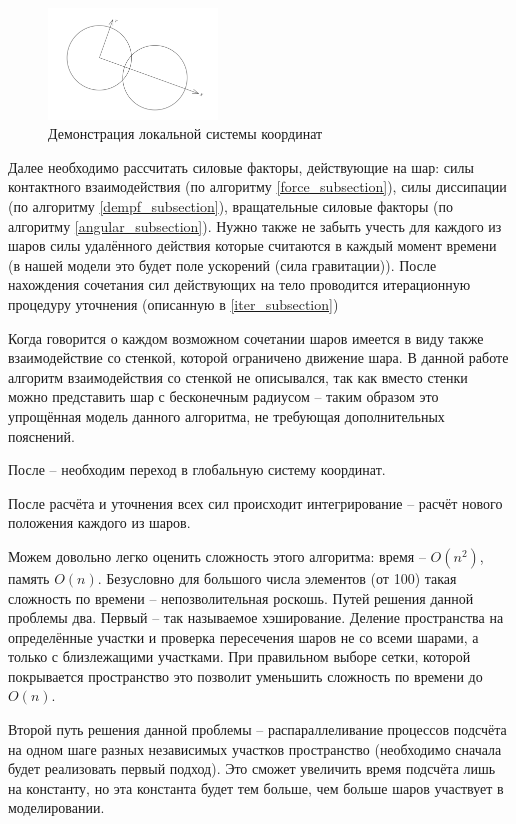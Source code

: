 \documentclass[a4paper]{article}
\begin{document}
\begin{figure}[h!]
	\centering
	\label{pic:local}
	\includegraphics[width=0.4\textwidth]{local}
	\caption{Демонстрация локальной системы координат}
\end{figure} 

Далее необходимо рассчитать силовые факторы, действующие на шар: силы контактного взаимодействия (по алгоритму \ref{force_subsection}), силы диссипации (по алгоритму \ref{dempf_subsection}), вращательные силовые факторы (по алгоритму \ref{angular_subsection}). 
Нужно также не забыть учесть для каждого из шаров силы удалённого действия которые считаются в каждый момент времени (в нашей модели это будет поле ускорений (сила гравитации)). 
После нахождения сочетания сил действующих на тело проводится итерационную процедуру уточнения (описанную в \ref{iter_subsection})

Когда говорится о каждом возможном сочетании шаров имеется в виду также взаимодействие со стенкой, которой ограничено движение шара. 
В данной работе алгоритм взаимодействия со стенкой не описывался, так как вместо стенки можно представить шар с бесконечным радиусом -- таким образом это упрощённая модель данного алгоритма, не требующая дополнительных пояснений.

После -- необходим переход в глобальную систему координат.

После расчёта и уточнения всех сил происходит интегрирование -- расчёт нового положения каждого из шаров.

Можем довольно легко оценить сложность этого алгоритма: время -- $O(n^2)$, память $O(n)$. 
Безусловно для большого числа элементов (от 100) такая сложность по времени -- непозволительная роскошь.
Путей решения данной проблемы два.
Первый -- так называемое хэширование. 
Деление пространства на определённые участки и проверка пересечения шаров не со всеми шарами, а только с близлежащими участками.
При правильном выборе сетки, которой покрывается пространство это позволит уменьшить сложность по времени до $O(n)$.

Второй путь решения данной проблемы --  распараллеливание процессов подсчёта на одном шаге разных независимых участков пространство (необходимо сначала будет реализовать первый подход). Это сможет увеличить время подсчёта лишь на константу, но эта константа будет тем больше, чем больше шаров участвует в моделировании.
\end{document}
